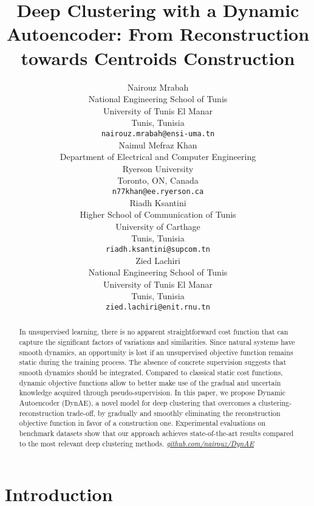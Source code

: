 \documentclass{article}
\title{Deep Clustering with a Dynamic Autoencoder: From Reconstruction towards Centroids Construction}
\author{
     Nairouz Mrabah\\
      National Engineering School of Tunis\\
      University of Tunis El Manar\\
     Tunis, Tunisia\\
   \texttt{nairouz.mrabah@ensi-uma.tn} \\
\And
  Naimul Mefraz Khan\\
  Department of Electrical and Computer Engineering\\
  Ryerson University\\
  Toronto, ON, Canada\\
  \texttt{n77khan@ee.ryerson.ca} \\
  \And
  Riadh Ksantini\\
  Higher School of Communication of Tunis\\
  University of Carthage\\
  Tunis, Tunisia\\
  \texttt{riadh.ksantini@supcom.tn}\\
  \And
  Zied Lachiri\\
  National Engineering School of Tunis\\
  University of Tunis El Manar\\
  Tunis, Tunisia\\
  \texttt{zied.lachiri@enit.rnu.tn}\\
}
\begin{document}
\maketitle

\begin{abstract}
In unsupervised learning, there is no apparent straightforward cost function that can capture the significant factors of variations and similarities. Since natural systems have smooth dynamics, an opportunity is lost if an unsupervised objective function remains static during the training process. The absence of concrete supervision suggests that smooth dynamics should be integrated. Compared to classical static cost functions, dynamic objective functions allow to better make use of the gradual and uncertain knowledge acquired through pseudo-supervision. In this paper, we propose Dynamic Autoencoder (DynAE), a novel model for deep clustering that overcomes a clustering-reconstruction trade-off, by gradually and smoothly eliminating the reconstruction objective function in favor of a construction one. Experimental evaluations on benchmark datasets show that our approach achieves state-of-the-art results compared to the most relevant deep clustering methods. \textit{\href{https://github.com/nairouz/DynAE}{github.com/nairouz/DynAE}} 
\end{abstract}




\section{Introduction}
\end{document}

